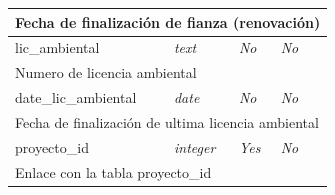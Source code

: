 \begin{longtable}{|l|l|l|l|l|}
	\multicolumn{ 5}{|l|}{Fecha de finalización de fianza (renovación)} \\ \hline
		lic\_ambiental & \textit{text} & \textit{No} & \textit{No} & \textit{} \\ \hline

	\multicolumn{ 5}{|l|}{Numero de licencia ambiental} \\ \hline
		date\_lic\_ambiental & \textit{date} & \textit{No} & \textit{No} & \textit{} \\ \hline

	\multicolumn{ 5}{|l|}{Fecha de finalización de ultima licencia ambiental} \\ \hline
		proyecto\_id & \textit{integer} & \textit{Yes} & \textit{No} & \textit{} \\ \hline

	\multicolumn{ 5}{|l|}{Enlace con la tabla proyecto\_id} \\ \hline
\end{longtable}


